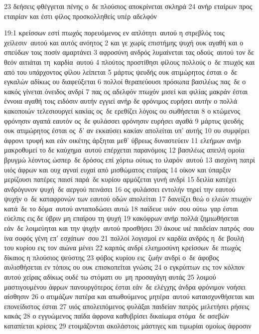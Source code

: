 \documentclass[10pt,oneside,footinclude=true,headinclude=true]{scrbook} %
\begin{document}
23 δεήσεις φθέγγεται πένης ο δε πλούσιος αποκρίνεται σκληρά
24 ανήρ εταίρων προς εταιρίαν και έστι φίλος προσκολληθείς υπέρ αδελφόν
\par
19:1 κρείσσων εστί πτωχός πορευόμενος εν απλότητι αυτού η στρεβλός τοις χείλεσιν αυτού και αυτός ανόητος
2 και γε χωρίς επιστήμης ψυχή ουκ αγαθή και ο σπεύδων τοις ποσίν αμαρτάνει
3 αφροσύνη ανδρός λυμαίνεται τας οδούς αυτού τον δε θεόν αιτιάται τη καρδία αυτού
4 πλούτος προστίθησι φίλους πολλούς ο δε πτωχός και από του υπάρχοντος φίλου λείπεται
5 μάρτυς ψευδής ουκ ατιμώρητος έσται ο δε εγκαλών αδίκως ου διαφεύξεται
6 πολλοί θεραπεύουσι πρόσωπα βασιλέως πας δε ο κακός γίνεται όνειδος ανδρί
7 πας ος αδελφόν πτωχόν μισεί και φιλίας μακράν έσται έννοια αγαθή τοις ειδόσιν αυτήν εγγιεί ανήρ δε φρόνιμος ευρήσει αυτήν ο πολλά κακοποιών τελεσιουργεί κακίας ος δε ερεθίζει λόγοις ου σωθήσεται
8 ο κτώμενος φρόνησιν αγαπά εαυτόν ος δε φυλάσσει φρόνησιν ευρήσει αγαθά
9 μάρτυς ψευδής ουκ ατιμώρητος έσται ος δ' αν εκκαύσει κακίαν απολείται υπ' αυτής
10 ου συμφέρει άφρονι τρυφή και εάν οικέτης άρξηται μεθ' ύβρεως δυναστεύειν
11 ελεήμων ανήρ μακροθυμεί το δε καύχημα αυτού επέρχεται παρανόμοις
12 βασιλέως απειλή ομοία βρυγμώ λέοντος ώσπερ δε δρόσος επί χόρτω ούτως το ιλαρόν αυτού
13 αισχύνη πατρί υιός άφρων και ουχ αγναί ευχαί από μισθώματος εταίρας
14 οίκον και ύπαρξιν μερίζουσι πατέρες παισί παρά δε κυρίου αρμόζεται γυνή ανδρί
15 δειλία κατέχει ανδρόγυνον ψυχή δε αεργού πεινάσει
16 ος φυλάσσει εντολήν τηρεί την εαυτού ψυχήν ο δε καταφρονών των εαυτού οδών απολείται
17 δανείζει θεώ ο ελεών πτωχόν κατά δε το δόμα αυτού ανταποδώσει αυτώ
18 παίδευε υιόν σου ούτω γαρ έσται εύελπις εις δε ύβριν μη επαίρου τη ψυχή
19 κακόφρων ανήρ πολλά ζημιωθήσεται εάν δε λοιμεύηται και την ψυχήν αυτού προσθήσει
20 άκουε υιέ παιδείαν πατρός σου ίνα σοφός γένη επ' εσχάτων σου
21 πολλοί λογισμοί εν καρδία ανδρός η δε βουλή του κυρίου εις τον αιώνα μένει
22 καρπός ανδρί ελεημοσύνη κρείσσων δε πτωχός δίκαιος η πλούσιος ψεύστης
23 φόβος κυρίου εις ζωήν ανδρί ο δε άφοβος αυλισθήσεται εν τόποις ου ουκ επισκοπείται γνώσις
24 ο εγκρύπτων εις τον κόλπον αυτού χείρας αδίκως ουδέ τω στόματι ου μη προσαγάγη αυτάς
25 λοιμού μαστιγουμένου άφρων πανουργότερος έσται εάν δε ελέγχης άνδρα φρόνιμον νοήσει αίσθησιν
26 ο ατιμάζων πατέρα και απωθούμενος μητέρα αυτού καταισχυνθήσεται και επονείδιστος έσται
27 υιός απολειπόμενος φυλάξαι παιδείαν πατρός μελετήσει ρήσεις κακάς
28 ο εγγυώμενος παίδα άφρονα καθυβρίσει δικαίωμα στόμα δε ασεβών καταπίεται κρίσεις
29 ετοιμάζονται ακολάστοις μάστιγες και τιμωρίαι ομοίως άφροσιν
\par
\end{document}
